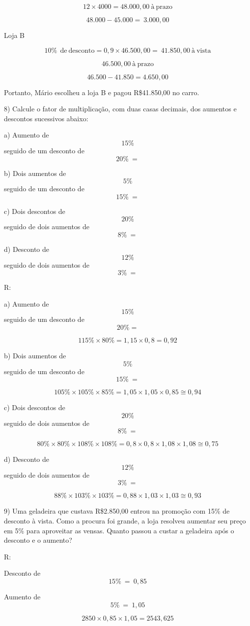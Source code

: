 \[12 \times 4000 = 48.000,00\ à\ \text{prazo}\]

\[48.000 - 45.000 = \ 3.000,00\]

Loja B

\[10\%\ \ \text{de}\ \text{desconto} = 0,9 \times 46.500,00 = \ 41.850,00\ à\ \text{vista}\]

\[ 46.500,00\ à\ \text{prazo}\]

\[46.500 - 41.850 = 4.650,00\]

Portanto, Mário escolheu a loja B e pagou R\$41.850,00 no carro.

8) Calcule o fator de multiplicação, com duas casas decimais, dos
aumentos e descontos sucessivos abaixo:

a) Aumento de \[15\%\] seguido de um desconto de \[20\%\  =\]

b) Dois aumentos de \[5\%\] seguido de um desconto de \[15\%\  =\]

c) Dois descontos de \[20\%\] seguido de dois aumentos de \[8\%\  =\]

d) Desconto de \[12\%\] seguido de dois aumentos de \[3\%\  =\]

R:

a) Aumento de \[15\%\] seguido de um desconto de \[20\% =\]

\[115\% \times 80\% = 1,15 \times 0,8 = 0,92\]

b) Dois aumentos de \[5\%\] seguido de um desconto de \[15\%\  =\]

\[105\% \times 105\% \times 85\% = 1,05 \times 1,05 \times 0,85 \cong 0,94\]

c) Dois descontos de \[20\%\] seguido de dois aumentos de \[8\%\  =\]

\[80\% \times 80\% \times 108\% \times 108\% = 0,8 \times 0,8 \times 1,08 \times 1,08 \cong 0,75\]

d) Desconto de \[12\%\] seguido de dois aumentos de \[3\%\  =\]

\[88\% \times 103\% \times 103\% = 0,88 \times 1,03 \times 1,03 \cong 0,93\]

9) Uma geladeira que custava R\$2.850,00 entrou na promoção com 15\% de
desconto à vista. Como a procura foi grande, a loja resolveu aumentar
seu preço em 5\% para aproveitar as vensas. Quanto passou a custar a
geladeira após o desconto e o aumento?

R:

Desconto de \[15\%\  = \ 0,85\]

Aumento de \[5\%\  = \ 1,05\]

\[2850 \times 0,85 \times 1,05 = 2543,625\]

